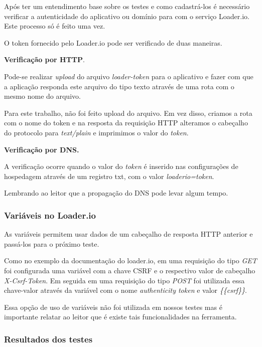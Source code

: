   Após ter um entendimento base sobre os testes e como cadastrá-los é necessário verificar a autenticidade do 
  aplicativo ou domínio para com o serviço Loader.io. Este processo só é feito uma vez. 
  
  O token fornecido pelo Loader.io pode ser verificado de duas maneiras.
  
  \textbf{Verificação por HTTP}.
  
  Pode-se realizar \textit{upload} do arquivo \textit{loader-token} para o aplicativo e fazer com que a aplicação
  responda este arquivo do tipo texto através de uma rota com o mesmo nome do arquivo. 
  
  Para este trabalho, não foi feito upload do arquivo. Em vez disso, criamos a rota com o nome do token e
  na resposta da requisição \ac{HTTP} alteramos o cabeçalho do protocolo para \textit{text/plain} e imprimimos
  o valor do \textit{token}.
  
  \textbf{Verificação por DNS.}
  
  A verificação ocorre quando o valor do \textit{token} é inserido nas configurações de hospedagem através de um
  registro txt, com o valor \textit{loaderio=token}.
  
  Lembrando ao leitor que a propagação do \ac{DNS} pode levar algum tempo.
  
\subsubsection{Variáveis no Loader.io}

  As variáveis permitem usar dados de um cabeçalho de resposta \ac{HTTP} anterior e passá-los para o próximo
  teste.
  
  Como no exemplo da documentação do loader.io, em uma requisição do tipo \textit{GET} foi configurada uma variável
  com a chave \ac{CSRF} e o respectivo valor de cabeçalho \textit{X-Csrf-Token}. Em seguida em uma requisição 
  do tipo \textit{POST} foi utilizada essa chave-valor através da variável com o nome \textit{authenticity token} e valor
  \textit{\{\{csrf\}\}}.
  
  Essa opção de uso de variáveis não foi utilizada em nossos testes mas é importante relatar ao leitor que
  é existe tais funcionalidades na ferramenta.

  
\subsubsection{Resultados dos testes}

